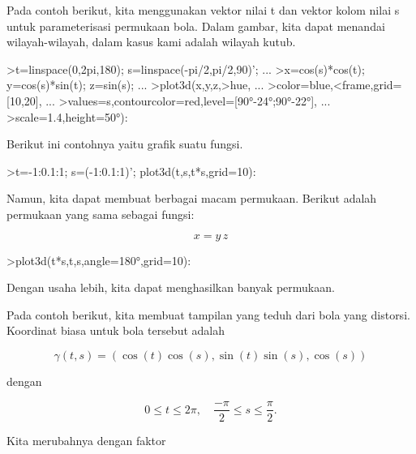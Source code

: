 \documentclass{article}
\begin{document}
\begin{eulernotebook}
\begin{eulercomment}
\begin{eulercomment}
\begin{eulercomment}
\begin{eulercomment}
\begin{eulercomment}
Pada contoh berikut, kita menggunakan vektor nilai t dan vektor kolom
nilai s untuk parameterisasi permukaan bola. Dalam gambar, kita dapat
menandai wilayah-wilayah, dalam kasus kami adalah wilayah kutub.
\end{eulercomment}
\begin{eulerprompt}
>t=linspace(0,2pi,180); s=linspace(-pi/2,pi/2,90)'; ...
>x=cos(s)*cos(t); y=cos(s)*sin(t); z=sin(s); ...
>plot3d(x,y,z,>hue, ...
>color=blue,<frame,grid=[10,20], ...
>values=s,contourcolor=red,level=[90°-24°;90°-22°], ...
>scale=1.4,height=50°):
\end{eulerprompt}
\begin{eulercomment}
Berikut ini contohnya yaitu grafik suatu fungsi.
\end{eulercomment}
\begin{eulerprompt}
>t=-1:0.1:1; s=(-1:0.1:1)'; plot3d(t,s,t*s,grid=10):
\end{eulerprompt}
\begin{eulercomment}
Namun, kita dapat membuat berbagai macam permukaan. Berikut adalah
permukaan yang sama sebagai fungsi:

\end{eulercomment}
\begin{eulerformula}
\[
x = y \, z
\]
\end{eulerformula}
\begin{eulerprompt}
>plot3d(t*s,t,s,angle=180°,grid=10):
\end{eulerprompt}
\begin{eulercomment}
Dengan usaha lebih, kita dapat menghasilkan banyak permukaan.

Pada contoh berikut, kita membuat tampilan yang teduh dari bola yang
distorsi. Koordinat biasa untuk bola tersebut adalah

\end{eulercomment}
\begin{eulerformula}
\[
\gamma(t,s) = (\cos(t)\cos(s),\sin(t)\sin(s),\cos(s))
\]
\end{eulerformula}
\begin{eulercomment}
dengan

\end{eulercomment}
\begin{eulerformula}
\[
0 \le t \le 2\pi, \quad \frac{-\pi}{2} \le s \le \frac{\pi}{2}.
\]
\end{eulerformula}
\begin{eulercomment}
Kita merubahnya dengan faktor


\end{eulercomment}
\end{eulercomment}
\end{eulercomment}
\end{eulercomment}
\end{eulercomment}
\end{eulernotebook}
\end{document}
